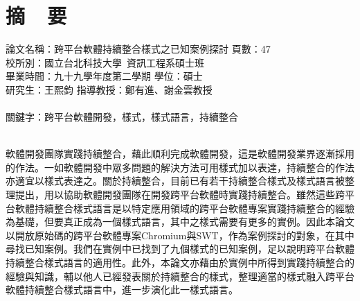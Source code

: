 \chapter*{摘~~要}


\noindent
論文名稱：跨平台軟體持續整合樣式之已知案例探討			\hspace*{\fill}頁數：47		            \\
校所別：國立台北科技大學~資訊工程系碩士班					  		  						\\
畢業時間：九十九學年度第二學期					\hspace*{\fill}學位：碩士		        \\
研究生：王熙鈞								\hspace*{\fill}指導教授：鄭有進、謝金雲教授\\
\hspace*{\fill}\\
\noindent
關鍵字：跨平台軟體開發，樣式，樣式語言，持續整合\\
\hspace*{\fill}\\
%
\indent

軟體開發團隊實踐持續整合，藉此順利完成軟體開發，這是軟體開發業界逐漸採用的作法。一如軟體開發中眾多問題的解決方法可用樣式加以表達，持續整合的作法亦適宜以樣式表達之。關於持續整合，目前已有若干持續整合樣式及樣式語言被整理提出，用以協助軟體開發團隊在開發跨平台軟體時實踐持續整合。雖然這些跨平台軟體持續整合樣式語言是以特定應用領域的跨平台軟體專案實踐持續整合的經驗為基礎，但要真正成為一個樣式語言，其中之樣式需要有更多的實例。因此本論文以開放原始碼的跨平台軟體專案\textendash\hspace{4pt}Chromium與SWT，作為案例探討的對象，在其中尋找已知案例。我們在實例中已找到了九個樣式的已知案例，足以說明跨平台軟體持續整合樣式語言的適用性。此外，本論文亦藉由於實例中所得到實踐持續整合的經驗與知識，輔以他人已經發表關於持續整合的樣式，整理適當的樣式融入跨平台軟體持續整合樣式語言中，進一步演化此一樣式語言。

